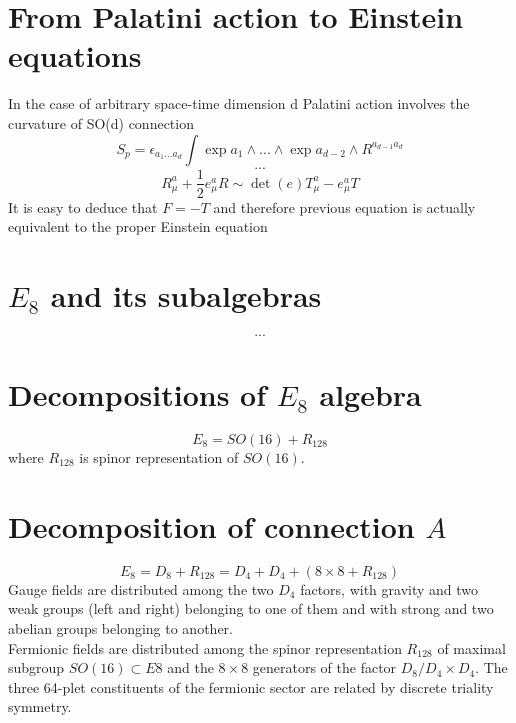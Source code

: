 \documentclass{article}
\begin{document}
\section{From Palatini action to Einstein equations}
In the case of arbitrary space-time dimension d Palatini action involves the curvature of SO(d) connection
\begin{equation}
    S_p = \epsilon_{a_1 ... a_d} \int \exp{a_1} \land ... \land \exp{a_{d-2}} \land R^{a_{d-1}a_d}
\end{equation}
\begin{equation}
    ...
\end{equation}
\begin{equation}
    R_\mu^a + \frac{1}{2}e_\mu^a R \sim \det(e)T_\mu^a - e^a_\mu T
\end{equation}
It is easy to deduce that $F = -T$ and therefore previous equation is actually equivalent to the proper Einstein equation

\section{$E_8$ and its subalgebras}
\begin{equation}
    ...
\end{equation}

\section{Decompositions of $E_8$ algebra}
\begin{equation}
    E_8 = SO(16) + R_{128}
\end{equation}
where $R_{128}$ is spinor representation of $SO(16)$.

\section{Decomposition of connection $A$}
\begin{equation}
    E_8 = D_8 + R_{128} = D_4 + D_4 + (8 \times 8 + R_{128})
\end{equation}
Gauge fields are distributed among the two $D_4$ factors, with gravity and two weak groups (left and right) belonging to one of them and with strong and two abelian groups belonging to another. \\
Fermionic fields are distributed among the spinor representation $R_128$ of maximal subgroup $SO(16) \subset E8$ and the $8 \times 8$ generators of the factor $D_8/D_4 \times D_4$. The three 64-plet constituents of the fermionic sector are related by discrete triality symmetry. \\
\end{document}
